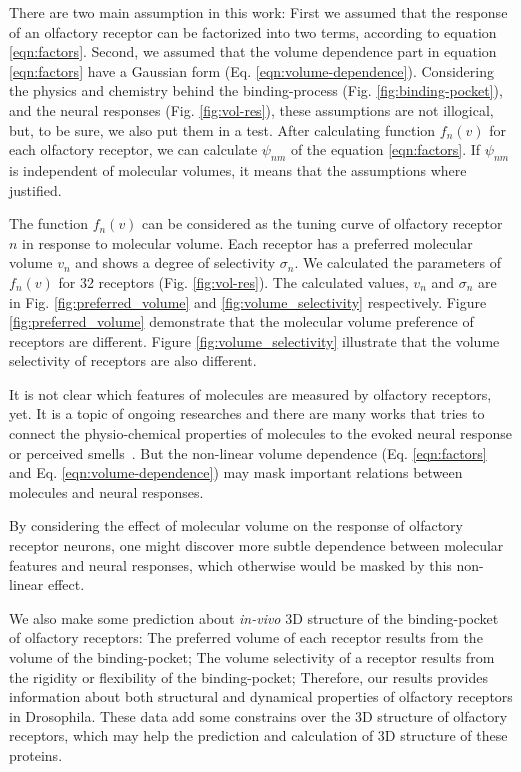 \documentclass[11pt]{paper} %
\newcommand{\numberofreceptors}{32 }
\begin{document}
There are two main assumption in this work: 
First we assumed that the response of an olfactory receptor can be factorized into two terms, 
according to equation \ref{eqn:factors}.
Second, we assumed that the volume dependence part in equation \ref{eqn:factors} 
have a Gaussian form (Eq. \ref{eqn:volume-dependence}).
Considering the physics and chemistry behind the binding-process (Fig. \ref{fig:binding-pocket}), 
and the neural responses (Fig. \ref{fig:vol-res}), these assumptions are not illogical, 
but, to be sure, we also put them in a test. 
After calculating function $f_n(v)$ for each olfactory receptor, we can calculate $\psi_{nm}$ of the equation \ref{eqn:factors}.
If $\psi_{nm}$ is independent of molecular volumes, it means that the assumptions where justified.

The function $f_n(v)$ can be considered as the tuning curve of olfactory receptor $n$ in response to molecular volume. 
Each receptor has a preferred molecular volume $v_n$ and shows a degree of selectivity $\sigma_n$. 
We calculated the parameters of $f_n(v)$ for \numberofreceptors receptors (Fig. \ref{fig:vol-res}). 
The calculated values, $v_n$ and $\sigma_n$ are in Fig. \ref{fig:preferred_volume} and \ref{fig:volume_selectivity} respectively.
Figure \ref{fig:preferred_volume} demonstrate that the molecular volume preference of receptors are different. 
Figure \ref{fig:volume_selectivity} illustrate that the volume selectivity of receptors are also different.

It is not clear which features of molecules are measured by olfactory receptors, yet. 
It is a topic of ongoing researches  
and there are many works that tries to connect the physio-chemical properties of molecules to the evoked neural response or perceived smells~\cite{Gabler2013,Schmuker2007}.
But the non-linear volume dependence (Eq. \ref{eqn:factors} and Eq. \ref{eqn:volume-dependence})  
may mask important relations between molecules and neural responses.

By considering the effect of molecular volume on the response of olfactory receptor neurons, 
one might discover more subtle dependence between molecular features and neural responses, 
which otherwise would be masked by this non-linear effect.

We also make some prediction about {\it in-vivo} 3D structure of the binding-pocket of olfactory receptors:
The preferred volume of each receptor results from the volume of the binding-pocket; 
The volume selectivity of a receptor results from the rigidity or flexibility of the binding-pocket; 
Therefore, our results provides information about both structural and dynamical properties of olfactory receptors in Drosophila. 
These data add some constrains over the 3D structure of olfactory receptors, 
which may help the prediction and calculation of 3D structure of these proteins. 
\end{document}
